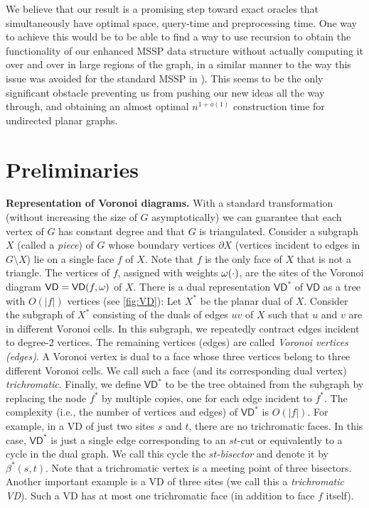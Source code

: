 \documentclass{article}
\newcommand{\VD}{\textsf{VD}}
\newcommand{\weight}{{\rm \omega}}
\newcommand{\X}{X}
\begin{document}
We believe that our result is a promising step toward exact oracles that simultaneously have optimal space, query-time and preprocessing time.
One way to achieve this would be to be able to find a way to use recursion to obtain the functionality of our enhanced MSSP data structure without actually computing it over and over in large regions of the graph, in a similar manner to the way this issue was avoided for the standard MSSP in \cite{ourJACM}).
This seems to be the only significant obstacle preventing us from pushing our new ideas all the way through, and obtaining an almost optimal $n^{1+o(1)}$ construction time for undirected planar graphs.




\section{Preliminaries}

\noindent
{\bf Representation of Voronoi diagrams.}
With a standard transformation (without increasing the size of $G$ asymptotically) we can guarantee that each vertex of $G$ has constant degree and that $G$ is triangulated.
Consider a subgraph $\X$ (called a {\em piece}) of $G$ whose boundary vertices $\partial \X$ (vertices incident to edges in $G\setminus \X$) lie on a single face $f$ of $\X$.
Note that $f$ is the only face of $\X$ that is not a triangle.
The vertices of $f$, assigned with weights $\weight(\cdot)$, are the sites of the Voronoi diagram $\VD=\VD(f,\weight)$ of $\X$.
There is a dual representation $\VD^*$ of $\VD$ as a tree with $O(|f|)$ vertices (see \cref{fig:VD}):
Let $\X^*$ be the planar dual of $\X$.
Consider the subgraph of $\X^*$ consisting of the duals of edges $uv$ of $\X$ such that $u$ and $v$ are in different Voronoi cells.
In this subgraph, we repeatedly contract edges incident to degree-2 vertices.
The remaining vertices (edges) are called {\em Voronoi vertices (edges)}.
A Voronoi vertex is dual to a face whose three vertices belong to three different Voronoi cells.
We call such a face (and its corresponding dual vertex) {\em trichromatic}.
Finally, we define $\VD^*$ to be the tree obtained from the subgraph by replacing the node $f^*$ by multiple copies, one for each edge incident to $f^*$.
The complexity (i.e., the number of vertices and edges) of $\VD^*$ is $O(|f|)$.
For example, in a VD of just two sites $s$ and $t$, there are no trichromatic faces.
In this case, $\VD^*$ is just a single edge corresponding to an $st$-cut or equivalently to a cycle in the dual graph.
We call this cycle the $st$-{\em bisector} and denote it by $\beta^*(s,t)$.
Note that a trichromatic vertex is a meeting point of three bisectors.
Another important example is a VD of three sites (we call this a {\em trichromatic VD}).
Such a VD has at most one trichromatic face (in addition to face $f$ itself).
\end{document}
